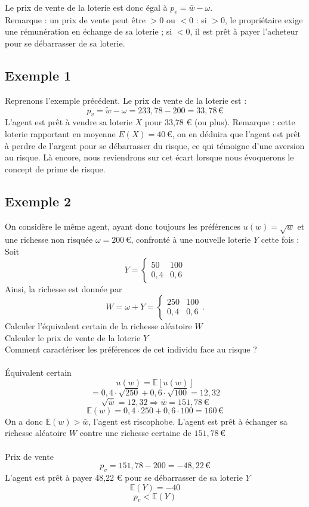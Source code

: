 \documentclass[a4paper, 12pt]{report}
\begin{document}
Le prix de vente de la loterie est donc égal à \( p_v = \bar{w} - \omega \). 
\noindent\\
Remarque : un prix de vente peut être \( > 0 \) ou \( < 0 \) : si \( > 0 \), le propriétaire exige une rémunération en échange de sa loterie ; si \( < 0 \), il est prêt à payer l'acheteur pour se débarrasser de sa loterie.

\subsection{Exemple 1}

Reprenons l'exemple précédent. Le prix de vente de la loterie est : 
\[
p_v = \tilde{w} - \omega = 233,78 - 200 = 33,78 \, \text{€}
\] 
L'agent est prêt à vendre sa loterie \( X \) pour 33,78 € (ou plus). Remarque : cette loterie rapportant en moyenne \( E(X) = 40 \, \text{€} \), on en déduira que l'agent est prêt à perdre de l'argent pour se débarrasser du risque, ce qui témoigne d'une aversion au risque. Là encore, nous reviendrons sur cet écart lorsque nous évoquerons le concept de prime de risque.

\subsection{Exemple 2}

On considère le même agent, ayant donc toujours les préférences \( u(w)=\sqrt{w} \) et une richesse non risquée \( \omega = 200 \, \text{€}\), confronté à une nouvelle loterie \( Y \) cette fois :
\noindent\\
Soit
\[ 
 Y = \begin{cases} 
50  & 100  \\ 
0,4 &  0,6 
\end{cases}
\]
Ainsi, la richesse est donnée par
\[ 
 W = \omega + Y = \begin{cases} 
	250 & 100 \\ 
	0,4 & 0,6 
\end{cases}.
  \]
Calculer l'équivalent certain de la richesse aléatoire \( W \)\\
\noindent
Calculer le prix de vente de la loterie \( Y \)\\
\noindent
Comment caractériser les préférences de cet individu face au risque ?\\
\noindent \\
Équivalent certain
\[ 
u(w)=\mathbb{E}\left[ u(w) \right]
\]
\[ 
=0,4\cdot\sqrt{250}+0,6\cdot\sqrt{100}=12,32
\]
\[ 
\sqrt{\bar{w}}=12,32 \Rightarrow \bar{w}=151,78 \,\text{€}
\]
\[ 
\mathbb{E}(w)=0,4\cdot250+0,6\cdot100=160\,\text{€}
 \]
On a donc \( \mathbb{E}(w)>\bar{w} \), l'agent est riscophobe. L'agent est prêt à échanger sa richesse aléatoire \( W \) contre une richesse certaine de \( 151,78 \,\text{€} \)
\\ \noindent \\
Prix de vente 
\[ 
p_v=151,78-200=-48,22 \,\text{€}
\]
L'agent est prêt à payer 48,22 € pour se débarrasser de sa loterie \(Y\)
\[ 
\mathbb{E}(Y)=-40
 \]
\[ 
p_v<\mathbb{E}(Y)
 \]
\end{document}
